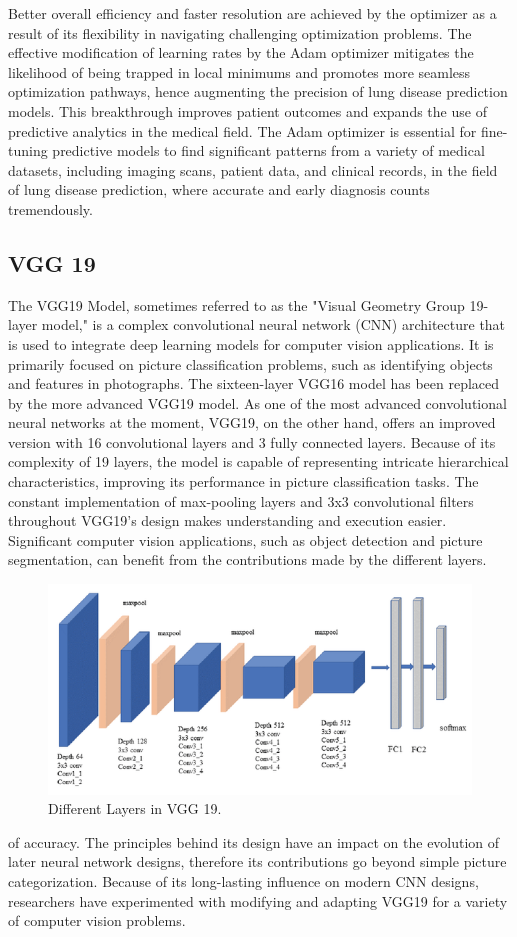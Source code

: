 Better overall efficiency and faster resolution are achieved by the optimizer as a result of its flexibility in navigating challenging optimization problems. The effective modification of learning rates by the Adam optimizer mitigates the likelihood of being trapped in local minimums and promotes more seamless optimization pathways, hence augmenting the precision of lung disease prediction models. This breakthrough improves patient outcomes and expands the use of predictive analytics in the medical field. The Adam optimizer is essential for fine-tuning predictive models to find significant patterns from a variety of medical datasets, including imaging scans, patient data, and clinical records, in the field of lung disease prediction, where accurate and early diagnosis counts tremendously.


\subsection{VGG 19}
The VGG19 Model, sometimes referred to as the "Visual Geometry Group 19-layer model," is a complex convolutional neural network (CNN) architecture that is used to integrate deep learning models for computer vision applications. It is primarily focused on picture classification problems, such as identifying objects and features in photographs. The sixteen-layer VGG16 model has been replaced by the more advanced VGG19 model. As one of the most advanced convolutional neural networks at the moment, VGG19, on the other hand, offers an improved version with 16 convolutional layers and 3 fully connected layers. Because of its complexity of 19 layers, the model is capable of representing intricate hierarchical characteristics, improving its performance in picture classification tasks. The constant implementation of max-pooling layers and 3x3 convolutional filters throughout VGG19's design makes understanding and execution easier. Significant computer vision applications, such as object detection and picture segmentation, can benefit from the contributions made by the different layers.
\begin{figure}[ht]
    \centering
    \includegraphics[scale=0.8]{figures/Picture1.png}
    \caption{Different Layers in VGG 19.}
    \label{fig:chart_a}
\end{figure}
of accuracy. The principles behind its design have an impact on the evolution of later neural network designs, therefore its contributions go beyond simple picture categorization. Because of its long-lasting influence on modern CNN designs, researchers have experimented with modifying and adapting VGG19 for a variety of computer vision problems.

